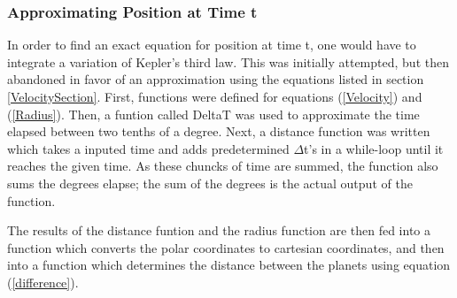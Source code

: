 \subsubsection{Approximating Position at Time t}
In order to find an exact equation for position at time t, one would have to integrate a variation of Kepler's
third law. This was initially attempted, but then abandoned in favor of an approximation using the equations listed in
section \ref{VelocitySection}. First, functions were defined for equations (\ref{Velocity}) and (\ref{Radius}). Then, a funtion called DeltaT was used to approximate the time elapsed between two tenths of a degree. Next, a distance function was written which takes a inputed time and adds predetermined $\Delta$t's in a while-loop until it reaches the given time. As these chuncks of time are summed, the function also sums the degrees elapse; the sum of the degrees is the actual output of the function. 

The results of the distance funtion and the radius function are then fed into a function which converts the polar coordinates to cartesian coordinates, and then into a function which determines the distance between the planets using equation (\ref{difference}).
%
